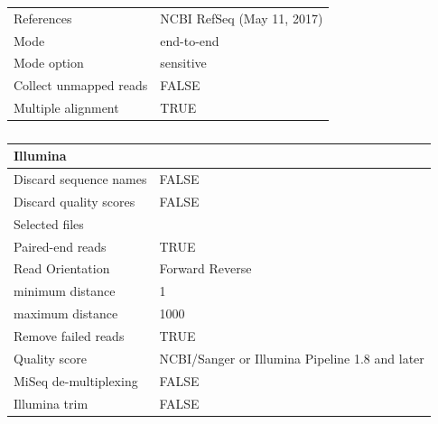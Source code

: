 \begin{table}[]
{\begin{tabular}{ll}
References                                         & NCBI RefSeq (May 11, 2017)         \\
Mode                                               & end-to-end                         \\
Mode option                                        & sensitive                          \\
Collect unmapped reads                             & FALSE                              \\
Multiple alignment                                 & TRUE                              
\end{tabular}%
}
\end{table}

\newpage

\begin{longtable}{ll}
\caption{}
\label{tab:ch2_suptable3}\\
\multicolumn{2}{l}{Illumina}                                                                  \\
\endfirsthead
%
\endhead
%
Discard sequence names                       & FALSE                                          \\
Discard quality scores                       & FALSE                                          \\
Selected files                               &                                                \\
Paired-end reads                             & TRUE                                           \\
Read Orientation                             & Forward Reverse                                \\
minimum distance                             & 1                                              \\
maximum distance                             & 1000                                           \\
Remove failed reads                          & TRUE                                           \\
Quality score                                & NCBI/Sanger or Illumina Pipeline 1.8 and later \\
MiSeq de-multiplexing                        & FALSE                                          \\
Illumina trim                                & FALSE                                          \\

\end{longtable}
